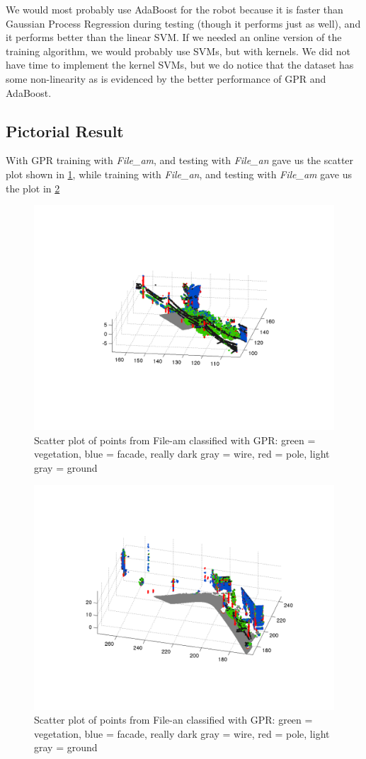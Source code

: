 \documentclass[letterpaper]{article}
\begin{document}
We would most probably use AdaBoost for the robot because it is faster
than Gaussian Process Regression during testing (though it performs
just as well), and it performs better than the linear SVM. If we
needed an online version of the training algorithm, we would probably
use SVMs, but with kernels. We did not have time to implement the
kernel SVMs, but we do notice that the dataset has some non-linearity
as is evidenced by the better performance of GPR and AdaBoost.

\subsection*{Pictorial Result}
With GPR training with \textit{File\_am}, and testing with \textit{File\_an} gave us the scatter plot shown in \ref{Fig_GPR1}, while training with \textit{File\_an}, and testing with \textit{File\_am} gave us the plot in \ref{Fig_GPR2}
\begin{figure}
\includegraphics[width=.8\linewidth]{gpr_trainam_testan.png}
\caption{Scatter plot of points from File-am classified with GPR: green = vegetation, blue = facade, really dark gray = wire, red = pole, light gray = ground}
\label{Fig_GPR1}
\end{figure}
\begin{figure}
\includegraphics[width=.8\linewidth]{gpr_trainan_testam.png}
\caption{Scatter plot of points from File-an classified with GPR: green = vegetation, blue = facade, really dark gray = wire, red = pole, light gray = ground}
\label{Fig_GPR2}
\end{figure}
\end{document}
